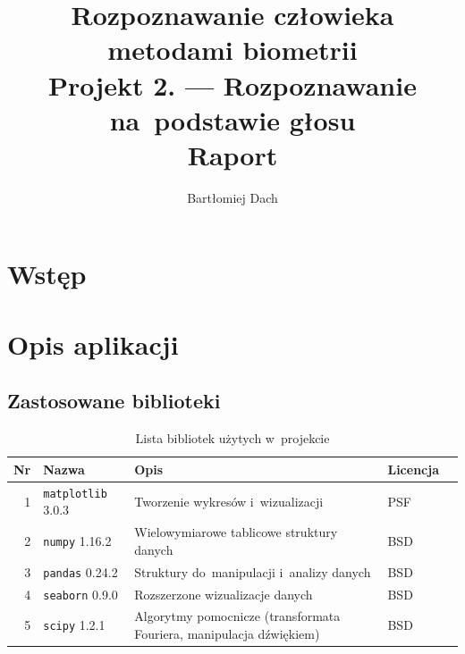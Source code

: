\documentclass[11pt,a4paper]{article}
\begin{document}
\title{Rozpoznawanie człowieka metodami biometrii \\
\Large{
    Projekt 2. --- Rozpoznawanie na~podstawie głosu \\
    Raport
}}
\author{Bartłomiej Dach}
\maketitle


\section{Wstęp}

\section{Opis aplikacji}

\subsection{Zastosowane biblioteki}

\begin{table}
    \begin{tabularx}{\textwidth}{|r|l|X|l|c|}
        \hline
        Nr & Nazwa & Opis & Licencja & \\
        \hline
        \hline
        1 & \texttt{matplotlib} 3.0.3 & Tworzenie wykresów i~wizualizacji & PSF & \cite{hunter2007} \\
        \hline
        2 & \texttt{numpy} 1.16.2 & Wielowymiarowe tablicowe struktury danych & BSD & \cite{oliphant2006} \\
        \hline
        3 & \texttt{pandas} 0.24.2 & Struktury do~manipulacji i~analizy danych & BSD & \cite{mckinney2010} \\
        \hline
        4 & \texttt{seaborn} 0.9.0 & Rozszerzone wizualizacje danych & BSD & \cite{waskom2018} \\
        \hline
        5 & \texttt{scipy} 1.2.1 & Algorytmy pomocnicze (transformata Fouriera, manipulacja dźwiękiem) & BSD & \cite{jones2001} \\
        \hline
    \end{tabularx}
    \caption{Lista bibliotek użytych w~projekcie}
    \label{tbl:libraries}
\end{table}
\end{document}
